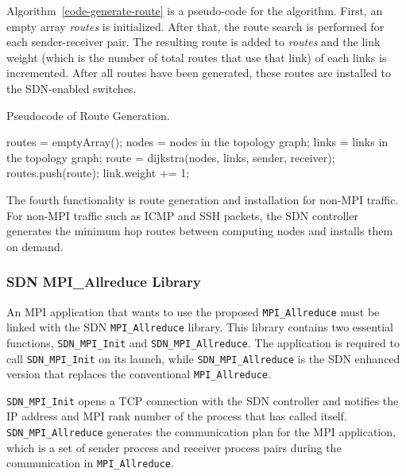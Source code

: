Algorithm~\ref{code-generate-route} is a pseudo-code for the algorithm.
First, an empty array \emph{routes} is initialized. After that, the
route search is performed for each sender-receiver pair. The resulting
route is added to \emph{routes} and the link weight (which is the number
of total routes that use that link) of each links is incremented. After
all routes have been generated, these routes are installed to the
SDN-enabled switches.

\begin{algorithm}
    \caption{Pseudocode of Route Generation.}%
    \label{code-generate-route}
    \begin{algorithmic}
        \STATE routes = emptyArray();
        \STATE nodes = nodes in the topology graph;
        \STATE links = links in the topology graph;
            \STATE route = dijkstra(nodes, links, sender, receiver);
            \STATE routes.push(route);
                \STATE link.weight += 1;
            \ENDFOR
        \ENDFOR
    \end{algorithmic}
\end{algorithm}

The fourth functionality is route generation and installation for
non-MPI traffic. For non-MPI traffic such as ICMP and SSH packets, the
SDN controller generates the minimum hop routes between computing nodes
and installs them on demand.

\hypertarget{sdn-mpi_allreduce-library}{%
\subsubsection{SDN MPI\_Allreduce
Library}\label{sdn-mpi_allreduce-library}}

An MPI application that wants to use the proposed
\texttt{MPI\_Allreduce} must be linked with the SDN
\texttt{MPI\_Allreduce} library. This library contains two essential
functions, \texttt{SDN\_MPI\_Init} and \texttt{SDN\_MPI\_Allreduce}. The
application is required to call \texttt{SDN\_MPI\_Init} on its launch,
while \texttt{SDN\_MPI\_Allreduce} is the SDN enhanced version that
replaces the conventional \texttt{MPI\_Allreduce}.

\texttt{SDN\_MPI\_Init} opens a TCP connection with the SDN controller
and notifies the IP address and MPI rank number of the process that has
called itself. \texttt{SDN\_MPI\_Allreduce} generates the communication
plan for the MPI application, which is a set of sender process and
receiver process pairs during the communication in
\texttt{MPI\_Allreduce}.

